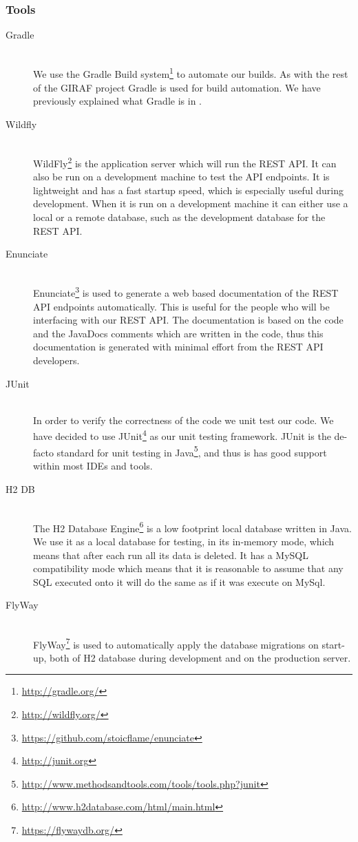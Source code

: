 \subsubsection{Tools}
\begin{description}
    \item[Gradle] \hfill \\
        We use the Gradle Build system\footnote{\url{http://gradle.org/}} to automate our builds.
        As with the rest of the GIRAF project Gradle is used for build automation.
        We have previously explained what Gradle is in .

    \item[Wildfly] \hfill \\
        WildFly\footnote{\url{http://wildfly.org/}} is the application server which will run the REST API.
        It can also be run on a development machine to test the API endpoints.
        It is lightweight and has a fast startup speed, which is especially useful during development.
        When it is run on a development machine it can either use a local or a remote database, such as the development database for the REST API.

    \item[Enunciate] \hfill \\
        Enunciate\footnote{\url{https://github.com/stoicflame/enunciate}} is used to generate a web based documentation of the REST API endpoints automatically.
        This is useful for the people who will be interfacing with our REST API.
        The documentation is based on the code and the JavaDocs comments which are written in the code, thus this documentation is generated with minimal effort from the REST API developers.

    \item[JUnit] \hfill \\
        In order to verify the correctness of the code we unit test our code.
        We have decided to use JUnit\footnote{\url{http://junit.org}} as our unit testing framework.
        JUnit is the de-facto standard for unit testing in Java\footnote{\url{http://www.methodsandtools.com/tools/tools.php?junit}}, and thus is has good support within most IDEs and tools.

    \item[H2 DB] \hfill \\
        The H2 Database Engine\footnote{\url{http://www.h2database.com/html/main.html}} is a low footprint local database written in Java.
        We use it as a local database for testing, in its in-memory mode, which means that after each run all its data is deleted.
        It has a MySQL compatibility mode which means that it is reasonable to assume that any SQL executed onto it will do the same as if it was execute on MySql.

    \item[FlyWay] \hfill \\
        FlyWay\footnote{\url{https://flywaydb.org/}} is used to automatically apply the database migrations on start-up, both of H2 database during development and on the production server.
\end{description}
